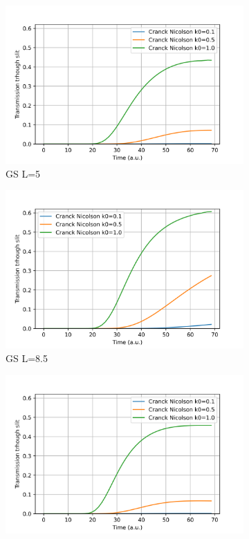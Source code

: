 \documentclass[11pt, a4paper]{article} %
\begin{document}
\begin{figure}[h!]
  \centering
  \begin{subfigure}[b]{0.25\linewidth}
    \includegraphics[width=\linewidth]{Transmission_GS_CN_L5.png}
    \caption{GS L=5}
  \end{subfigure}
  \begin{subfigure}[b]{0.24\linewidth}
    \includegraphics[width=\linewidth]{Transmission_GS_CN_L8.5.png}
    \caption{GS L=8.5}
  \end{subfigure}
    \begin{subfigure}[b]{0.25\linewidth}
    \includegraphics[width=\linewidth]{Transmission_GG_CN_L5.png}

\end{subfigure}
\end{figure}
\end{document}
